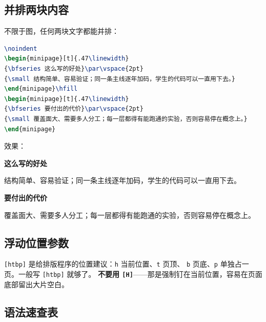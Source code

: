 \subsection{并排两块内容}

不限于图，任何两块文字都能并排：

\begin{lstlisting}[language=TeX]
\noindent
\begin{minipage}[t]{.47\linewidth}
{\bfseries 这么写的好处}\par\vspace{2pt}
{\small 结构简单、容易验证；同一条主线逐年加码，学生的代码可以一直用下去。}
\end{minipage}\hfill
\begin{minipage}[t]{.47\linewidth}
{\bfseries 要付出的代价}\par\vspace{2pt}
{\small 覆盖面大、需要多人分工；每一层都得有能跑通的实验，否则容易停在概念上。}
\end{minipage}
\end{lstlisting}

效果：

\noindent
\begin{minipage}[t]{.47\linewidth}
{\bfseries 这么写的好处}\par\vspace{2pt}
{\small 结构简单、容易验证；同一条主线逐年加码，学生的代码可以一直用下去。}
\end{minipage}\hfill
\begin{minipage}[t]{.47\linewidth}
{\bfseries 要付出的代价}\par\vspace{2pt}
{\small 覆盖面大、需要多人分工；每一层都得有能跑通的实验，否则容易停在概念上。}
\end{minipage}

\subsection{浮动位置参数}

\texttt{[htbp]} 是给排版程序的位置建议：\texttt{h} 当前位置、\texttt{t} 页顶、
\texttt{b} 页底、\texttt{p} 单独占一页。一般写 \verb|[htbp]| 就够了。
\textbf{不要用 \texttt{[H]}}——那是强制钉在当前位置，容易在页面底部留出大片空白。

\subsection{语法速查表}

